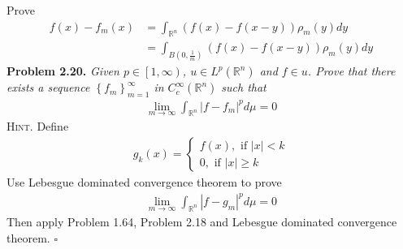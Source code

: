 \documentclass[a4paper]{article}
\numberwithin{equation}{section}
\begin{document}
Prove
\begin{align}
f\left( x \right) - {f_m}\left( x \right) &= \int_{{\mathbb{R}^n}} {\left( {f\left( x \right) - f\left( {x - y} \right)} \right){\rho _m}\left( y \right)dy} \\
 &= \int_{B\left( {0,\frac{1}{m}} \right)} {\left( {f\left( x \right) - f\left( {x - y} \right)} \right){\rho _m}\left( y \right)dy} 
\end{align}
\textbf{Problem 2.20.} \textit{Given $p\in \left[1,\infty\right)$, $u\in L^p\left(\mathbb{R}^n\right)$ and $f\in u$. Prove that there exists a sequence $\left\{ {{f_m}} \right\}_{m = 1}^\infty $ in $C_c^\infty \left(\mathbb{R}^n\right)$ such that}
\begin{align}
\mathop {\lim }\limits_{m \to \infty } \int_{{\mathbb{R}^n}} {{{\left| {f - {f_m}} \right|}^p}d\mu }  = 0
\end{align}
\textsc{Hint.} Define
\begin{align}
{g_k}\left( x \right) = \left\{ {\begin{array}{*{20}{c}}
{f\left( x \right),\mbox{ if }\left| x \right| < k}\\
{0,\mbox{ if }\left| x \right| \ge k}
\end{array}} \right.
\end{align}
Use Lebesgue dominated convergence theorem to prove
\begin{align}
\mathop {\lim }\limits_{m \to \infty } \int_{{\mathbb{R}^n}} {{{\left| {f - {g_m}} \right|}^p}d\mu }  = 0
\end{align}
Then apply Problem 1.64, Problem 2.18 and Lebesgue dominated convergence theorem. \hfill $\square$
\end{document}
